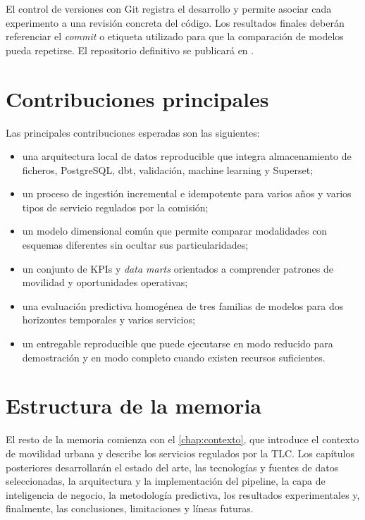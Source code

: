 El control de versiones con Git registra el desarrollo y permite asociar cada experimento a una revisión concreta del código. Los resultados finales deberán referenciar el \textit{commit} o etiqueta utilizado para que la comparación de modelos pueda repetirse. El repositorio definitivo se publicará en \ProjectRepository.

\section{Contribuciones principales}

Las principales contribuciones esperadas son las siguientes:

\begin{itemize}
    \item una arquitectura local de datos reproducible que integra almacenamiento de ficheros, PostgreSQL, dbt, validación, machine learning y Superset;
    \item un proceso de ingestión incremental e idempotente para varios años y varios tipos de servicio regulados por la comisión;
    \item un modelo dimensional común que permite comparar modalidades con esquemas diferentes sin ocultar sus particularidades;
    \item un conjunto de KPIs y \textit{data marts} orientados a comprender patrones de movilidad y oportunidades operativas;
    \item una evaluación predictiva homogénea de tres familias de modelos para dos horizontes temporales y varios servicios;
    \item un entregable reproducible que puede ejecutarse en modo reducido para demostración y en modo completo cuando existen recursos suficientes.
\end{itemize}

\section{Estructura de la memoria}

El resto de la memoria comienza con el \cref{chap:contexto}, que introduce el contexto de movilidad urbana y describe los servicios regulados por la TLC\@. Los capítulos posteriores desarrollarán el estado del arte, las tecnologías y fuentes de datos seleccionadas, la arquitectura y la implementación del pipeline, la capa de inteligencia de negocio, la metodología predictiva, los resultados experimentales y, finalmente, las conclusiones, limitaciones y líneas futuras.
